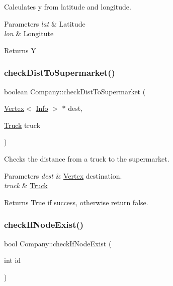 Calculates y from latitude and longitude. 


\begin{DoxyParams}{Parameters}
{\em lat} & Latitude \\
\hline
{\em lon} & Longitute \\
\hline
\end{DoxyParams}
\begin{DoxyReturn}{Returns}
Y 
\end{DoxyReturn}
\mbox{\label{class_company_a0e42957c25959699229475aa7f634def}} 
\subsubsection{\texorpdfstring{check\+Dist\+To\+Supermarket()}{checkDistToSupermarket()}}
{\footnotesize\ttfamily boolean Company\+::check\+Dist\+To\+Supermarket (\begin{DoxyParamCaption}\item[{\hyperlink{class_vertex}{Vertex}$<$ \hyperlink{class_info}{Info} $>$ $\ast$}]{dest,  }\item[{\hyperlink{class_truck}{Truck}}]{truck }\end{DoxyParamCaption})}



Checks the distance from a truck to the supermarket. 


\begin{DoxyParams}{Parameters}
{\em dest} & \hyperlink{class_vertex}{Vertex} destination. \\
\hline
{\em truck} & \hyperlink{class_truck}{Truck}\\
\hline
\end{DoxyParams}
\begin{DoxyReturn}{Returns}
True if success, otherwise return false. 
\end{DoxyReturn}
\mbox{\label{class_company_a06095b0acb0b928cc5795c2e69aa3448}} 
\subsubsection{\texorpdfstring{check\+If\+Node\+Exist()}{checkIfNodeExist()}}
{\footnotesize\ttfamily bool Company\+::check\+If\+Node\+Exist (\begin{DoxyParamCaption}\item[{int}]{id }\end{DoxyParamCaption})}



